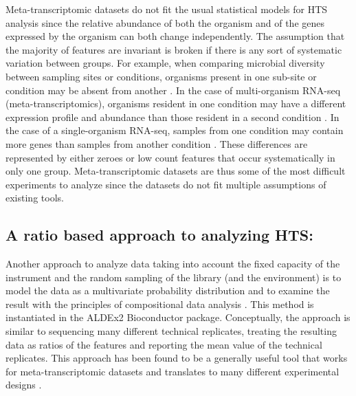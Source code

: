 \documentclass{bmcart}
\begin{document}
Meta-transcriptomic datasets do not fit the usual statistical models for HTS analysis since the relative abundance of both the organism and of the genes expressed by the organism can both change independently. The assumption that the majority of features are invariant is broken if there is any sort of systematic variation between groups. For example, when comparing microbial diversity between sampling sites or conditions, organisms present in one sub-site or condition may be absent from another \cite{Macklaim:2015aa,Hummelen:2010,Gajer:2012}. In the case of multi-organism RNA-seq (meta-transcriptomics), organisms resident in one condition may have a different expression profile and abundance than those resident in a second condition \cite{macklaim:2013}. In the case of a single-organism RNA-seq, samples from one condition may contain more genes than samples from another condition \cite{Lang:2015aa,Peng:2014aa,Zhao:2013aa,Gierlinski:2015aa}. These differences are represented by either zeroes or low count features that occur systematically in only one group. Meta-transcriptomic datasets are thus some of the most difficult experiments to analyze \cite{fernandes:2013, macklaim:2013} since the datasets do not fit multiple assumptions of existing tools. 

\subsection*{A ratio based approach to analyzing HTS:}
Another approach to analyze data taking into account the fixed capacity of the instrument and the random sampling of the library (and the environment) is to model the data as a multivariate probability distribution and to examine the result with the principles of compositional data analysis \cite{Aitchison:1986,fernandes:2013}. This method is instantiated in the ALDEx2 Bioconductor package. Conceptually, the approach is similar to sequencing many different technical replicates, treating the resulting data as ratios of the features and reporting the mean value of the technical replicates. This approach has been found to be a generally useful tool that works for meta-transcriptomic datasets \cite{macklaim:2013} and translates to many different experimental designs \cite{fernandes:2014, mcmurrough:2014}. 
\end{document}
